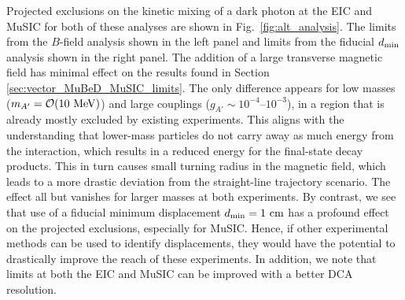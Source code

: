 Projected exclusions on the kinetic mixing of a dark photon at the EIC and MuSIC for both of these analyses are shown in Fig.~\ref{fig:alt_analysis}. The limits from the $B$-field analysis shown in the left panel and limits from the fiducial $d_{\rm min}$ analysis shown in the right panel. The addition of a large transverse magnetic field has minimal effect on the results found in Section \ref{sec:vector_MuBeD_MuSIC_limits}. The only difference appears for low masses ($m_{A'} = {\cal O}(10~{\rm MeV})$) and large couplings ($g_{A'} \sim 10^{-4}$--$10^{-3}$), in a region that is already mostly excluded by existing experiments. This aligns with the understanding that lower-mass particles do not carry away as much energy from the interaction, which results in a reduced energy for the final-state decay products. This in turn causes small turning radius in the magnetic field, which leads to a more drastic deviation from the straight-line trajectory scenario. The effect all but vanishes for larger masses at both experiments.  By contrast, we see that use of a fiducial minimum displacement $d_{\rm min} = 1~{\rm cm}$ has a profound effect on the projected exclusions, especially for MuSIC. Hence, if other experimental methods can be used to identify displacements, they would have the potential to drastically improve the reach of these experiments. In addition, we note that limits at both the EIC and MuSIC can be improved with a better DCA resolution.


